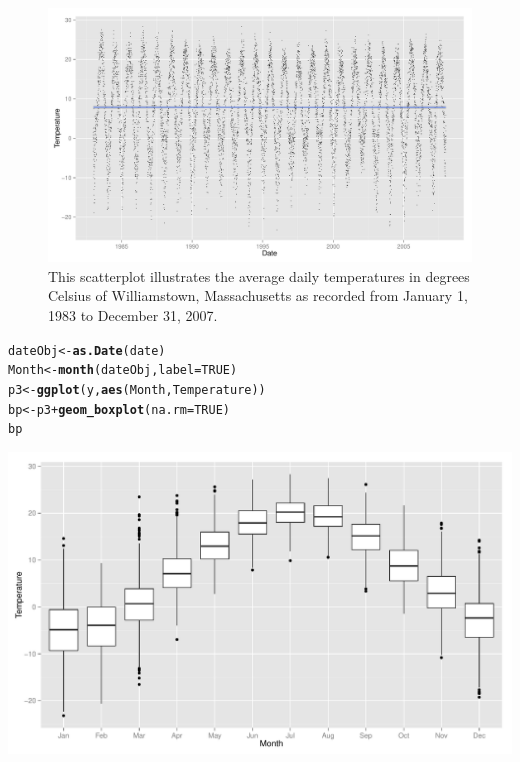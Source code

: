 \documentclass{article}\usepackage{graphicx, color}
\makeatletter
\def\maxwidth{ %
  \ifdim\Gin@nat@width>\linewidth
    \linewidth
  \else
    \Gin@nat@width
  \fi
}
\newcommand{\hlfunctioncall}[1]{\textcolor[rgb]{0.501960784313725,0,0.329411764705882}{\textbf{#1}}}%
\newenvironment{kframe}{%
 \def\at@end@of@kframe{}%
 \ifinner\ifhmode%
  \def\at@end@of@kframe{\end{minipage}}%
  \begin{minipage}{\columnwidth}%
 \fi\fi%
 \def\FrameCommand##1{\hskip\@totalleftmargin \hskip-\fboxsep
 \colorbox{shadecolor}{##1}\hskip-\fboxsep
     \hskip-\linewidth \hskip-\@totalleftmargin \hskip\columnwidth}%
 \MakeFramed {\advance\hsize-\width
   \@totalleftmargin\z@ \linewidth\hsize
   \@setminipage}}%
 {\par\unskip\endMakeFramed%
 \at@end@of@kframe}
\newenvironment{knitrout}{}{} %
\makeatother
\begin{document}
\begin{landscape}
\begin{figure}
\begin{knitrout}
\color{fgcolor}
\includegraphics[width=\maxwidth]{figure/graph3Landscape} 

\end{knitrout}


\caption{This scatterplot illustrates the average daily temperatures in
  degrees Celsius of Williamstown, Massachusetts as recorded from
  January 1, 1983 to December 31, 2007.}
\end{figure}
\end{landscape}

\begin{knitrout}
\color{fgcolor}\begin{kframe}
\begin{alltt}
dateObj <- \hlfunctioncall{as.Date}(date)
Month <- \hlfunctioncall{month}(dateObj, label = TRUE)
p3 <- \hlfunctioncall{ggplot}(y, \hlfunctioncall{aes}(Month, Temperature))
bp <- p3 + \hlfunctioncall{geom_boxplot}(na.rm = TRUE)
bp
\end{alltt}
\end{kframe}
\includegraphics[width=\maxwidth]{figure/graph3BoxPlot} 

\end{knitrout}
\end{document}
